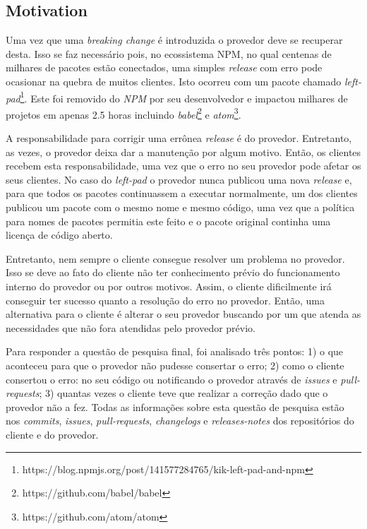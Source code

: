 \subsection{Motivation}
\label{mot:rq3}

Uma vez que uma \textit{breaking change} é introduzida o provedor deve se recuperar desta. Isso se faz necessário pois, no ecossistema \gls{NPM}, no qual centenas de milhares de pacotes estão conectados, uma simples \textit{release} com erro pode ocasionar na quebra de muitos clientes. Isto ocorreu com um pacote chamado \textit{left-pad}\footnote{https://blog.npmjs.org/post/141577284765/kik-left-pad-and-npm}. Este foi removido do \textit{NPM} por seu desenvolvedor e impactou milhares de projetos em apenas 2.5 horas incluindo \textit{babel}\footnote{https://github.com/babel/babel} e \textit{atom}\footnote{https://github.com/atom/atom}.

A responsabilidade para corrigir uma errônea \textit{release} é do provedor. Entretanto, as vezes, o provedor deixa dar a manutenção por algum motivo. Então, os clientes recebem esta responsabilidade, uma vez que o erro no seu provedor pode afetar os seus clientes. No caso do \textit{left-pad} o provedor nunca publicou uma nova \textit{release} e, para que todos os pacotes continuassem a executar normalmente, um dos clientes publicou um pacote com o mesmo nome e mesmo código, uma vez que a política para nomes de pacotes permitia este feito e o pacote original continha uma licença de código aberto.

Entretanto, nem sempre o cliente consegue resolver um problema no provedor. Isso se deve ao fato do cliente não ter conhecimento prévio do funcionamento interno do provedor ou por outros motivos. Assim, o cliente dificilmente irá conseguir ter sucesso quanto a resolução do erro no provedor. Então, uma alternativa para o cliente é alterar o seu provedor buscando por um que atenda as necessidades que não fora atendidas pelo provedor prévio.

Para responder a questão de pesquisa final, foi analisado três pontos: 1) o que aconteceu para que o provedor não pudesse consertar o erro; 2) como o cliente consertou o erro: no seu código ou notificando o provedor através de \textit{issues} e \textit{pull-requests}; 3) quantas vezes o cliente teve que realizar a correção dado que o provedor não a fez. Todas as informações sobre esta questão de pesquisa estão nos \textit{commits}, \textit{issues}, \textit{pull-requests}, \textit{changelogs} e \textit{releases-notes} dos repositórios do cliente e do provedor.

